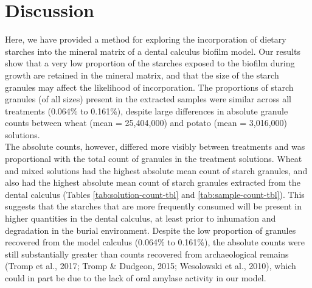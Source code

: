 \documentclass[
]{article}
\begin{document}
\hypertarget{discussion}{%
\section{Discussion}\label{discussion}}

Here, we have provided a method for exploring the incorporation of dietary
starches into the mineral matrix of a dental calculus biofilm model. Our results show
that a very low proportion of the starches exposed to the biofilm during growth are
retained in the mineral matrix, and that the size of the starch granules
may affect the likelihood of incorporation. The proportions of starch granules
(of all sizes) present in the extracted samples were similar across all treatments
(0.064\% to 0.161\%),
despite large differences in absolute granule counts between wheat
(mean = 25,404,000)
and potato
(mean = 3,016,000)
solutions.\\
The absolute counts, however, differed more visibly between treatments and was
proportional with the total count of granules in the treatment solutions. Wheat
and mixed solutions had the highest absolute mean count of starch granules, and
also had the highest absolute mean count of starch granules extracted from the
dental calculus
(Tables \ref{tab:solution-count-tbl} and \ref{tab:sample-count-tbl}).
This suggests that the starches that are more frequently consumed will be present
in higher quantities in the dental calculus, at least prior to inhumation and
degradation in the burial environment.
Despite the low proportion of granules recovered from the model calculus
(0.064\% to 0.161\%),
the absolute counts were still substantially greater than counts recovered from
archaeological remains
(Tromp et al., 2017; Tromp \& Dudgeon, 2015; Wesolowski et al., 2010), which could in part be due to the
lack of oral amylase activity in our model.
\end{document}
